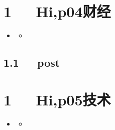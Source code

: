 \documentclass[letterpaper,10pt,english]{sphinxmanual}
\begin{document}
\chapter{1   Hi,p04财经}
\label{\detokenize{p04_u8d22_u7ecf/Hello_uff0cp04_u8d22_u7ecf:hi-p04}}\label{\detokenize{p04_u8d22_u7ecf/Hello_uff0cp04_u8d22_u7ecf::doc}}
\begin{sphinxShadowBox}
\begin{itemize}
\item {} 
\label{\detokenize{p04_u8d22_u7ecf/Hello_uff0cp04_u8d22_u7ecf:id2}}{\hyperref[\detokenize{p04_u8d22_u7ecf/Hello_uff0cp04_u8d22_u7ecf:hi-p04}]{}}
\begin{itemize}
\item {} 
\label{\detokenize{p04_u8d22_u7ecf/Hello_uff0cp04_u8d22_u7ecf:id3}}{\hyperref[\detokenize{p04_u8d22_u7ecf/Hello_uff0cp04_u8d22_u7ecf:post}]{}}

\end{itemize}

\end{itemize}
\end{sphinxShadowBox}


\section{1.1   post}
\label{\detokenize{p04_u8d22_u7ecf/Hello_uff0cp04_u8d22_u7ecf:post}}

\chapter{1   Hi,p05技术}
\label{\detokenize{p05_u6280_u672f/Hello_uff0cp05_u6280_u672f:hi-p05}}\label{\detokenize{p05_u6280_u672f/Hello_uff0cp05_u6280_u672f::doc}}
\begin{sphinxShadowBox}
\begin{itemize}
\item {} 
\label{\detokenize{p05_u6280_u672f/Hello_uff0cp05_u6280_u672f:id2}}{\hyperref[\detokenize{p05_u6280_u672f/Hello_uff0cp05_u6280_u672f:hi-p05}]{}}
\begin{itemize}
\item {} 
\label{\detokenize{p05_u6280_u672f/Hello_uff0cp05_u6280_u672f:id3}}{\hyperref[\detokenize{p05_u6280_u672f/Hello_uff0cp05_u6280_u672f:post}]{}}

\end{itemize}

\end{itemize}
\end{sphinxShadowBox}
\end{document}
